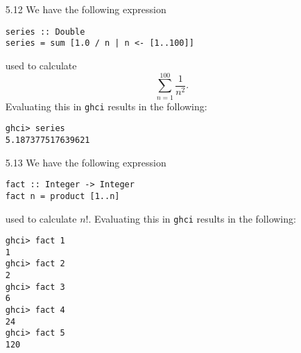 \documentclass{article}
\begin{document}
\begin{itemize}
\begin{verbatim}
[0.0,3.0,6.0]
ghci> [0,3..7.499999999]
[0.0,3.0,6.0]
ghci> [0,3..7]
[0,3,6]
ghci> [0,3..8]
[0,3,6]
ghci> [0,3..9]
[0,3,6,9]
        \end{verbatim}
        \item[5.12] We have the following expression 
        \begin{verbatim}
series :: Double
series = sum [1.0 / n | n <- [1..100]]
        \end{verbatim}
        used to calculate
        \[
            \sum_{n=1}^{100} \frac{1}{n^2}.
        \]
        Evaluating this in \verb|ghci| results in the following:
        \begin{verbatim}
ghci> series
5.187377517639621
        \end{verbatim}
        \item[5.13] We have the following expression 
        \begin{verbatim}
fact :: Integer -> Integer
fact n = product [1..n]
        \end{verbatim}
        used to calculate $n!$. Evaluating this in \verb|ghci| results in the 
        following:
        \begin{verbatim}
ghci> fact 1
1
ghci> fact 2
2
ghci> fact 3
6
ghci> fact 4
24
ghci> fact 5
120
        \end{verbatim}
    \end{itemize}
\end{document}
